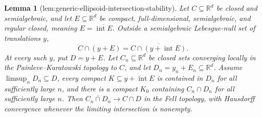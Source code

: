 \documentclass{article}
\newtheorem{lemma}{Lemma}
\begin{document}
\begin{lemma}[lem:generic-ellipsoid-intersection-stability]\label{lem:generic-ellipsoid-intersection-stability}
Let \(C\subseteq\mathbb R^d\) be closed and semialgebraic, and let \(E\subseteq\mathbb R^d\) be compact, full-dimensional, semialgebraic, and regular closed, meaning \(E=\overline{\operatorname{int}E}\). Outside a semialgebraic Lebesgue-null set of translations \(y\),
\[
 C\cap(y+E)=\overline{C\cap(y+\operatorname{int}E)}.
\]
At every such \(y\), put \(D=y+E\). Let \(C_n\subseteq\mathbb R^d\) be closed sets converging locally in the Painleve--Kuratowski topology to \(C\), and let \(D_n=y_n+E_n\subseteq\mathbb R^d\). Assume \(\limsup_nD_n\subseteq D\), every compact \(K\subseteq y+\operatorname{int}E\) is contained in \(D_n\) for all sufficiently large \(n\), and there is a compact \(K_0\) containing \(C_n\cap D_n\) for all sufficiently large \(n\). Then \(\overline{C_n\cap D_n}\to C\cap D\) in the Fell topology, with Hausdorff convergence whenever the limiting intersection is nonempty.
\end{lemma}
\end{document}
